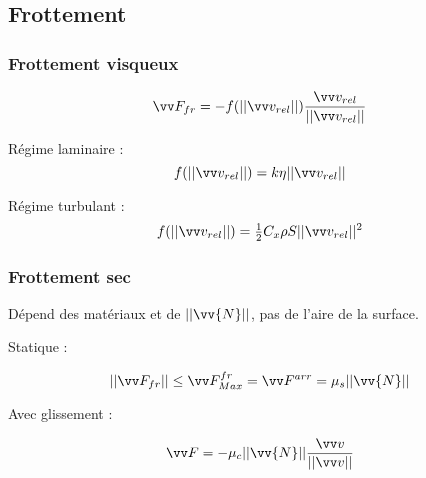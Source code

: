 \documentclass[../main.tex]{subfiles}
\begin{document}
\subsection{Frottement}


\subsubsection{Frottement visqueux}
\[
  \F_{fr} = -f(||\vi_{rel}||)\frac{\vi_{rel}}{||\vi_{rel}||}
\]

Régime laminaire : 
\[
  f(||\vi_{rel}||)=k\eta||\vi_{rel}||
\]

Régime turbulant :
\[
  f(||\vi_{rel}||) = \tfrac{1}{2}C_x\rho S||\vi_{rel}||^2
\]

\subsubsection{Frottement sec}
Dépend des matériaux et de \(||\vv{N}||\), pas de l'aire de la surface. 

Statique :

\[
  ||\F_{fr}|| \leq \F_{Max}^{fr} = \F^{arr}= \mu_s||\vv{N}||
\]

Avec glissement :

\[
  \F=-\mu_c||\vv{N}||\frac{\vi}{||\vi||}
\]
\end{document}
